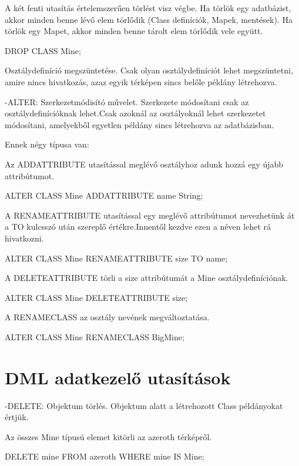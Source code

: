 \begin{sql}
A két fenti utasítás értelemszerűen törlést visz végbe. Ha törlök egy adatbázist, akkor minden benne lévő elem törlődik (Class definíciók, Mapek, mentések).
Ha törlök  egy Mapet, akkor minden benne tárolt elem törlődik vele együtt.

\begin{sql}
DROP CLASS Mine;
\end{sql}

Osztálydefiníció megszüntetése. Csak olyan osztálydefiníciót lehet megszüntetni, amire nincs hivatkozás, azaz egyik térképen sincs belőle példány létrehozva.

-ALTER: Szerkezetmódisító művelet. 
Szerkezete módosítani csak az osztálydefinícióknak lehet.Csak azoknál az osztályoknál lehet szerkezetet módosítani, amelyekből egyetlen példány sincs létrehozva az adatbázisban.

Ennek négy típusa van:

Az ADDATTRIBUTE utasítással meglévő osztályhoz adunk hozzá egy újabb attribútumot.
\begin{sql}
ALTER CLASS Mine ADDATTRIBUTE name String;
\end{sql}

A RENAMEATTRIBUTE utasítással egy meglévő attribútumot nevezhetünk át a TO kulcsszó után szereplő értékre.Innentől kezdve ezen a néven lehet rá hivatkozni.
\begin{sql}
ALTER CLASS Mine RENAMEATTRIBUTE size TO name;
\end{sql}

A DELETEATTRIBUTE törli a size attribútumát a Mine osztálydefiníciónak.
\begin{sql}
ALTER CLASS Mine DELETEATTRIBUTE size;
\end{sql}

A RENAMECLASS az osztály nevének megváltoztatása.
\begin{sql}
ALTER CLASS Mine RENAMECLASS BigMine;
\end{sql}


\section{DML adatkezelő utasítások}

-DELETE: Objektum törlés. Objektum alatt a létrehozott Class példányokat értjük.

Az összes Mine típusú elemet kitörli az azeroth térképről.
\begin{sql}
DELETE mine FROM azeroth WHERE  mine IS Mine;
\end{sql}


\end{sql}

